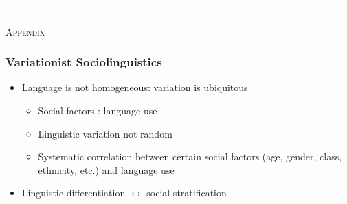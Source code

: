 \documentclass[12pt, table]{beamer}
\begin{document}
\begin{frame}
\textcolor{white}{"}\\[.5cm]

\begin{tiny}

\end{tiny} 
\end{frame}

\begin{frame}[plain]
\titlepage 
\end{frame}

\begin{frame}
\begin{center}
\textsc{\textcolor{uq}{Appendix}}
\end{center}
\end{frame}

\begin{frame}
\frametitle{Variationist Sociolinguistics}
\begin{itemize}
\item  Language is not homogeneous: variation is ubiquitous
\begin{itemize}
\item  Social factors : language use
\item  Linguistic variation not random
\item  Systematic correlation between certain social factors (age, gender, class, ethnicity, etc.) and language use
\end{itemize}
\item  Linguistic differentiation $\leftrightarrow$ social stratification
\end{itemize}
\end{frame}
\end{document}
